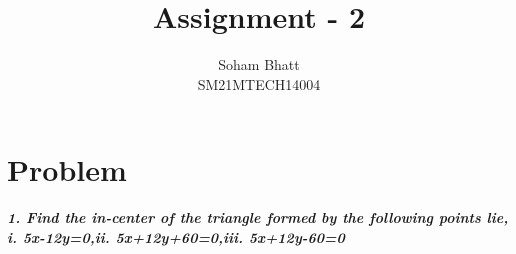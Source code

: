 \documentclass[journal,12pt,twocolumn]{IEEEtran}
\begin{document}
\newcommand{\myvec}[1]{\ensuremath{\begin{pmatrix}#1\end{pmatrix}}}
\newcommand{\cmyvec}[1]{\ensuremath{\begin{pmatrix*}[c]#1\end{pmatrix*}}}
\providecommand{\norm}[1]{\lVert#1\rVert}
\newcommand{\mydet}[1]{\ensuremath{\begin{vmatrix}#1\end{vmatrix}}}
\providecommand{\sbrak}[1]{\ensuremath{{}\left[#1\right]}}
\providecommand{\lsbrak}[1]{\ensuremath{{}\left[#1\right.}}
\providecommand{\rsbrak}[1]{\ensuremath{{}\left.#1\right]}}
\providecommand{\brak}[1]{\ensuremath{\left(#1\right)}}
\providecommand{\lbrak}[1]{\ensuremath{\left(#1\right.}}
\providecommand{\rbrak}[1]{\ensuremath{\left.#1\right)}}
\providecommand{\cbrak}[1]{\ensuremath{\left\{#1\right\}}}
\providecommand{\lcbrak}[1]{\ensuremath{\left\{#1\right.}}
\providecommand{\rcbrak}[1]{\ensuremath{\left.#1\right\}}}
\let\StandardTheFigure\thefigure
\let\vec\mathbf

\title{
Assignment - 2
}
\author{ Soham Bhatt \\SM21MTECH14004}
\maketitle
\newpage
\bigskip

\section*{\textbf{Problem}}
\noindent
\textbf{\textsl{1. Find the in-center of the triangle formed by the following points lie,}}
$$$$
\textbf{\textsl{i. 5x-12y=0,\quad ii. 5x+12y+60=0,\quad iii. 5x+12y-60=0}}
\noindent
\end{document}
